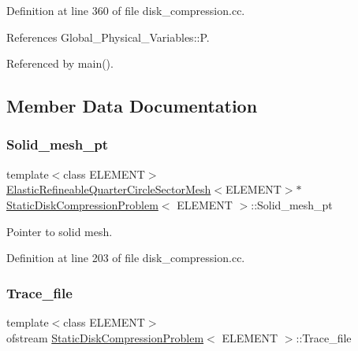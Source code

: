 Definition at line 360 of file disk\+\_\+compression.\+cc.



References Global\+\_\+\+Physical\+\_\+\+Variables\+::P.



Referenced by main().



\subsection{Member Data Documentation}
\mbox{\label{classStaticDiskCompressionProblem_a6ad5b428d535a90f71e2e9325e9a5b15}} 
\subsubsection{\texorpdfstring{Solid\+\_\+mesh\+\_\+pt}{Solid\_mesh\_pt}}
{\footnotesize\ttfamily template$<$class E\+L\+E\+M\+E\+NT$>$ \\
\hyperlink{classElasticRefineableQuarterCircleSectorMesh}{Elastic\+Refineable\+Quarter\+Circle\+Sector\+Mesh}$<$E\+L\+E\+M\+E\+NT$>$$\ast$ \hyperlink{classStaticDiskCompressionProblem}{Static\+Disk\+Compression\+Problem}$<$ E\+L\+E\+M\+E\+NT $>$\+::Solid\+\_\+mesh\+\_\+pt\hspace{0.3cm}{\ttfamily [private]}}



Pointer to solid mesh. 



Definition at line 203 of file disk\+\_\+compression.\+cc.

\mbox{\label{classStaticDiskCompressionProblem_a7affbfca1efcaadb4770386dc7d23e4c}} 
\subsubsection{\texorpdfstring{Trace\+\_\+file}{Trace\_file}}
{\footnotesize\ttfamily template$<$class E\+L\+E\+M\+E\+NT$>$ \\
ofstream \hyperlink{classStaticDiskCompressionProblem}{Static\+Disk\+Compression\+Problem}$<$ E\+L\+E\+M\+E\+NT $>$\+::Trace\+\_\+file\hspace{0.3cm}{\ttfamily [private]}}



